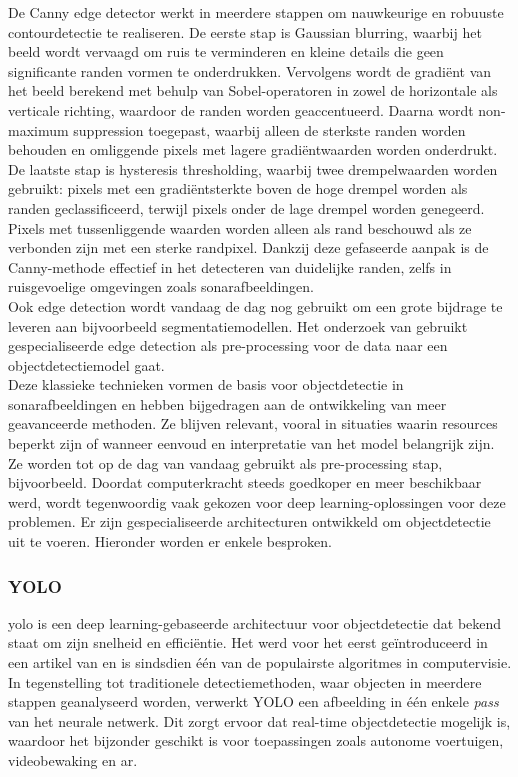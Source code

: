 De Canny edge detector werkt in meerdere stappen om nauwkeurige en robuuste contourdetectie te realiseren. De eerste stap is Gaussian blurring, waarbij het beeld wordt vervaagd om ruis te verminderen en kleine details die geen significante randen vormen te onderdrukken. Vervolgens wordt de gradiënt van het beeld berekend met behulp van Sobel-operatoren in zowel de horizontale als verticale richting, waardoor de randen worden geaccentueerd. Daarna wordt non-maximum suppression toegepast, waarbij alleen de sterkste randen worden behouden en omliggende pixels met lagere gradiëntwaarden worden onderdrukt. De laatste stap is hysteresis thresholding, waarbij twee drempelwaarden worden gebruikt: pixels met een gradiëntsterkte boven de hoge drempel worden als randen geclassificeerd, terwijl pixels onder de lage drempel worden genegeerd. Pixels met tussenliggende waarden worden alleen als rand beschouwd als ze verbonden zijn met een sterke randpixel. Dankzij deze gefaseerde aanpak is de Canny-methode effectief in het detecteren van duidelijke randen, zelfs in ruisgevoelige omgevingen zoals sonarafbeeldingen. \autocite{Ding_2001} \\

Ook edge detection wordt vandaag de dag nog gebruikt om een grote bijdrage te leveren aan bijvoorbeeld segmentatiemodellen. Het onderzoek van \textcite{Priyadharsini_2019} gebruikt gespecialiseerde edge detection als pre-processing voor de data naar een objectdetectiemodel gaat. \\

Deze klassieke technieken vormen de basis voor objectdetectie in sonarafbeeldingen en hebben bijgedragen aan de ontwikkeling van meer geavanceerde methoden. Ze blijven relevant, vooral in situaties waarin resources beperkt zijn of wanneer eenvoud en interpretatie van het model belangrijk zijn. Ze worden tot op de dag van vandaag gebruikt als pre-processing stap, bijvoorbeeld. Doordat computerkracht steeds goedkoper en meer beschikbaar werd, wordt tegenwoordig vaak gekozen voor deep learning-oplossingen voor deze problemen. Er zijn gespecialiseerde architecturen ontwikkeld om objectdetectie uit te voeren. Hieronder worden er enkele besproken.

\subsubsection{YOLO}

\acrfull{yolo} is een deep learning-gebaseerde architectuur voor objectdetectie dat bekend staat om zijn snelheid en efficiëntie. Het werd voor het eerst geïntroduceerd in een artikel van \textcite{Redmon_2016} en is sindsdien één van de populairste algoritmes in computervisie. In tegenstelling tot traditionele detectiemethoden, waar objecten in meerdere stappen geanalyseerd worden, verwerkt YOLO een afbeelding in één enkele \emph{pass} van het neurale netwerk. Dit zorgt ervoor dat real-time objectdetectie mogelijk is, waardoor het bijzonder geschikt is voor toepassingen zoals autonome voertuigen, videobewaking en \gls{ar}.

